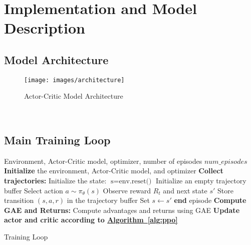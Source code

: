 \section{Implementation and Model Description}
\label{sec:implementation-and-model-description}

\subsection{Model Architecture}
\label{subsec:model-architecture}

\begin{figure}[H]
    \centering
    \texttt{[image: images/architecture]}
    \caption{Actor-Critic Model Architecture}
    \label{fig:model-architecture}
\end{figure}\

\subsection{Main Training Loop}
\label{subsec:main-training-loop}

\begin{algorithm}[H]
    \begin{algorithmic}[1]
        \Require Environment, Actor-Critic model, optimizer, number of episodes $num\_episodes$
        \State \textbf{Initialize} the environment, Actor-Critic model, and optimizer
            \State \textbf{Collect trajectories:}
            \State \hspace{1em} Initialize the state: $\text{s} = \text{env.reset()}$
            \State \hspace{1em} Initialize an empty trajectory buffer
                \State \hspace{1em} Select action $a \sim \pi_{\theta}(s)$
                \State \hspace{1em} Observe reward $R_t$ and next state $s'$
                \State \hspace{1em} Store transition $(s, a, r)$ in the trajectory buffer
                \State \hspace{1em} Set $s \leftarrow s'$
                    \State \hspace{1em} \textbf{end} episode
                \EndIf
            \EndFor
            \State \textbf{Compute GAE and Returns:}
            \State \hspace{1em} Compute advantages and returns using GAE
            \State \textbf{Update actor and critic according to \hyperref[alg:algorithm]{Algorithm~\ref{alg:ppo}}}
        \EndFor
    \end{algorithmic}
    \caption{Training Loop}
    \label{alg:algorithm}
\end{algorithm}

\begin{algorithmic}

\end{algorithmic}

